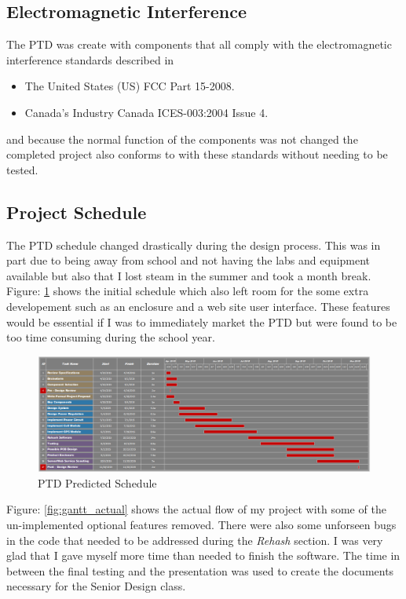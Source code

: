 \documentclass[11pt]{article}
\begin{document}
\subsection{Electromagnetic Interference}
The PTD was create with components that all comply with the electromagnetic interference standards described in 
\begin{itemize}
    \item The United States (US) FCC Part 15-2008.
    \item Canada's Industry Canada ICES-003:2004 Issue 4.
\end{itemize}
and because the normal function of the components was not changed the completed project also conforms to with these standards without needing to be tested.

\subsection{Project Schedule}
The PTD schedule changed drastically during the design process. This was in part due to being away from school and not having the labs and 
equipment available but also that I lost steam in the summer and took a month break. Figure: \ref{fig:gantt_predicted} shows the initial schedule 
which also left room for the some extra developement such as an enclosure and a web site user interface. These features would be essential if I 
was to immediately market the PTD but were found to be too time consuming during the school year.

\begin{figure}[H]
    \centering
        \includegraphics[scale=0.5]{gantt_proposal.png}
    \caption{PTD Predicted Schedule}
    \label{fig:gantt_predicted}
\end{figure}

Figure: \ref{fig:gantt_actual} shows the actual flow of my project with some of the un-implemented optional features removed. There were also some 
unforseen bugs in the code that needed to be addressed during the \textit{Rehash} section. I was very glad that I gave myself more time than needed 
to finish the software. The time in between the final testing and the presentation was used to create the documents necessary for the Senior Design 
class.
\end{document}
